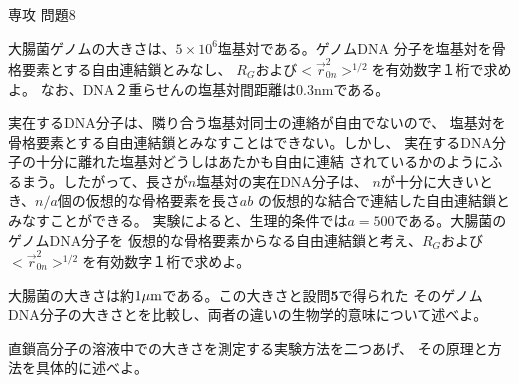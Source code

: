 \documentclass[fleqn]{jbook}
\begin{document}
\begin{question}{専攻 問題8}{}
\begin{subquestions}
\SubQuestion
  大腸菌ゲノムの大きさは、$5\times10^6$塩基対である。ゲノムDNA
分子を塩基対を骨格要素とする自由連結鎖とみなし、
$R_G$および$<\vec{r}_{0n}^2>^{1/2}$を有効数字１桁で求めよ。
なお、DNA２重らせんの塩基対間距離は0.3nmである。

\SubQuestion
   実在するDNA分子は、隣り合う塩基対同士の連絡が自由でないので、
塩基対を骨格要素とする自由連結鎖とみなすことはできない。しかし、
実在するDNA分子の十分に離れた塩基対どうしはあたかも自由に連結
されているかのようにふるまう。したがって、長さが$n$塩基対の実在DNA分子は、
$n$が十分に大きいとき、$n/a$個の仮想的な骨格要素を長さ$ab$
の仮想的な結合で連結した自由連結鎖とみなすことができる。
実験によると、生理的条件では$a=500$である。大腸菌のゲノムDNA分子を
仮想的な骨格要素からなる自由連結鎖と考え、$R_G$および
$<\vec{r}_{0n}^2>^{1/2}$を有効数字１桁で求めよ。

\SubQuestion
  大腸菌の大きさは約$\rm 1\mu m$である。この大きさと設問{\bf 5}で得られた
そのゲノムDNA分子の大きさとを比較し、両者の違いの生物学的意味について述べよ。

\SubQuestion
  直鎖高分子の溶液中での大きさを測定する実験方法を二つあげ、
その原理と方法を具体的に述べよ。

\end{subquestions}
\end{question}
\end{document}
